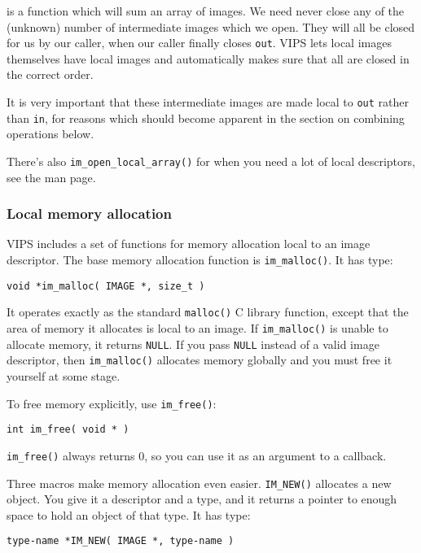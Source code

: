  is a function which will sum an array of images.
We need never close any of the (unknown) number of intermediate images which
we open. They will all be closed for us by our caller, when our caller
finally closes \verb+out+. VIPS lets local images themselves have local
images and automatically makes sure that all are closed in the correct order.

It is very important that these intermediate images are made local to
\verb+out+ rather than \verb+in+, for reasons which should become apparent
in the section on combining operations below.

There's also \verb+im_open_local_array()+ for when you need a lot of local
descriptors, see the man page.

\subsubsection{Local memory allocation}
\label{sec:malloc}

VIPS includes a set of functions for memory allocation local to an image
descriptor. The base memory allocation function is \verb+im_malloc()+. It
has type:

\begin{verbatim}
void *im_malloc( IMAGE *, size_t )
\end{verbatim}

It operates exactly as the standard \verb+malloc()+ C library function,
except that the area of memory it allocates is local to an image.
If \verb+im_malloc()+ is unable to allocate memory, it returns
\verb+NULL+. If you pass \verb+NULL+ instead of a valid image descriptor,
then \verb+im_malloc()+ allocates memory globally and you must free it
yourself at some stage.

To free memory explicitly, use \verb+im_free()+:

\begin{verbatim}
int im_free( void * )
\end{verbatim}

\noindent
\verb+im_free()+ always returns 0, so you can use it as an argument to a
callback.

Three macros make memory allocation even easier. \verb+IM_NEW()+ allocates
a new object. You give it a descriptor and a type, and it returns a pointer
to enough space to hold an object of that type. It has type:

\begin{verbatim}
type-name *IM_NEW( IMAGE *, type-name )
\end{verbatim}

